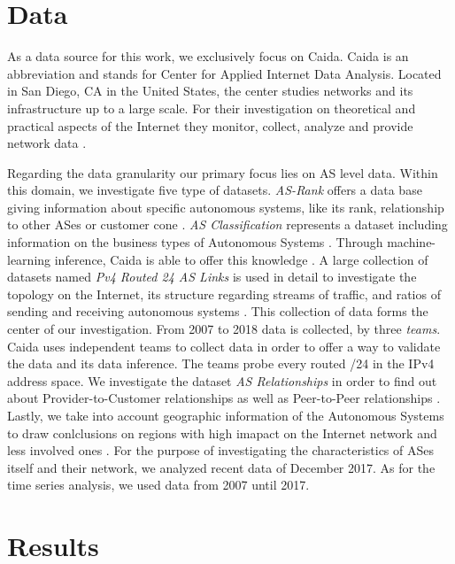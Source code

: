 \documentclass[conference, 11pt]{IEEEtran}
\begin{document}
\section{Data}
As a data source for this work, we exclusively focus on Caida. Caida is an abbreviation and stands for Center for Applied Internet Data Analysis. Located in San Diego, CA in the United States, the center studies networks and its infrastructure up to a large scale. For their investigation on theoretical and practical aspects of the Internet they monitor, collect, analyze and provide network data \cite{Caida}. \\  \linebreak

Regarding the data granularity our primary focus lies on AS level data. Within this domain, we investigate five type of datasets. \textit{AS-Rank} offers a data base giving information about specific autonomous systems, like its rank, relationship to other ASes or customer cone  \cite{Rank} . \textit{AS Classification} represents a dataset including information on the business types of Autonomous Systems \cite{Classification}. Through machine-learning inference, Caida is able to offer this knowledge  \cite{Classification}. A large collection of datasets named \textit{Pv4 Routed 24 AS Links} is used in detail to investigate the topology on the Internet, its structure regarding streams of traffic, and ratios of sending and receiving autonomous systems  \cite{IPv4Data}. This collection of data forms the center of our investigation. From 2007 to 2018 data is collected, by three \textit{teams}. Caida uses independent teams to collect data in order to offer a way to validate the data and its data inference. The teams probe every routed /24 in the IPv4 address space.
We investigate the dataset \textit{AS Relationships} in order to find out about Provider-to-Customer relationships as well as Peer-to-Peer relationships \cite{CaidaRelationshipsData}.  Lastly, we take into account geographic information of the Autonomous Systems to draw conlclusions on regions with high imapact on the Internet network and less involved ones  \cite{CaidaGeoData}. For the purpose of investigating the characteristics of ASes itself and their network, we analyzed recent data of December 2017.  As for the time series analysis, we used data from 2007 until 2017. \\


\section{Results}
\end{document}
